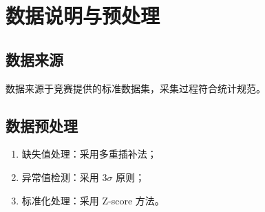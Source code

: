 \section{数据说明与预处理}

\subsection{数据来源}

数据来源于竞赛提供的标准数据集，采集过程符合统计规范。

\subsection{数据预处理}

\begin{enumerate}
  \item 缺失值处理：采用多重插补法；
  \item 异常值检测：采用 $3\sigma$ 原则；
  \item 标准化处理：采用 Z-score 方法。
\end{enumerate}
